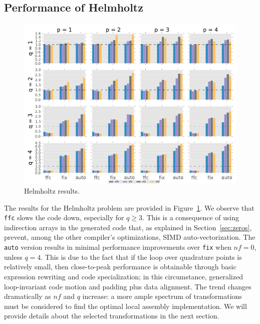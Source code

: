 \subsection{Performance of Helmholtz}
\begin{figure}[t]
\centerline{\includegraphics[scale=0.7]{coffee/perf-results/allforms/helmholtz}}
\caption{Helmholtz results.}\label{fig:coffee-allforms-helmholtz}
\end{figure}
The results for the Helmholtz problem are provided in Figure~\ref{fig:coffee-allforms-helmholtz}. We observe that \texttt{ffc} slows the code down, especially for $q \geq 3$. This is a consequence of using indirection arrays in the generated code that, as explained in Section~\ref{sec:zeros}, prevent, among the other compiler's optimizations, SIMD auto-vectorization. The \texttt{auto} version results in minimal performance improvements over \texttt{fix} when $nf=0$, unless $q=4$. This is due to the fact that if the loop over quadrature points is relatively small, then close-to-peak performance is obtainable through basic expression rewriting and code specialization; in this circumstance, generalized loop-invariant code motion and padding plus data alignment. The trend changes dramatically as $nf$ and $q$ increase: a more ample spectrum of transformations must be considered to find the optimal local assembly implementation. We will provide details about the selected transformations in the next section.

